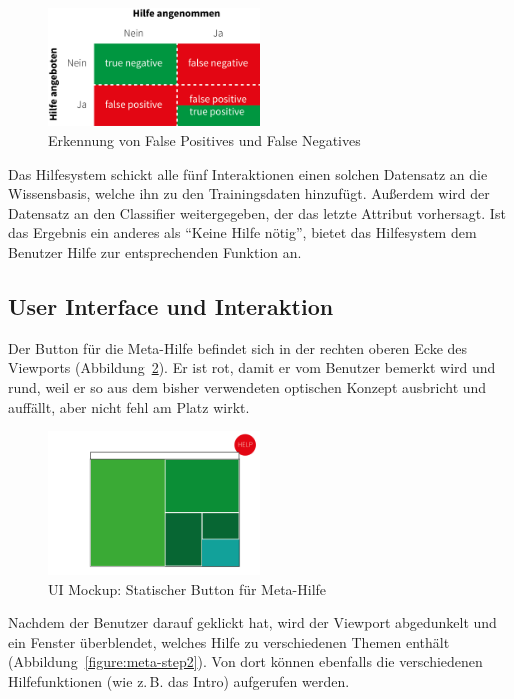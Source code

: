 \documentclass[
	headsepline,
	footsepline,
	fontsize=12pt,
	bibliography=totoc
]{scrbook}
\begin{document}
\begin{figure}[htbp]
   \centering
   \includegraphics[width=0.5\textwidth]{images/konzeption-meta-dyn-id.png}
   \caption{Erkennung von False Positives und False Negatives}
   \label{figure:meta-dyn-id}
\end{figure}

Das Hilfesystem schickt alle fünf Interaktionen einen solchen Datensatz an die Wissensbasis, welche ihn zu den Trainingsdaten hinzufügt. Außerdem wird der Datensatz an den Classifier weitergegeben, der das letzte Attribut vorhersagt. Ist das Ergebnis ein anderes als \enquote{Keine Hilfe nötig}, bietet das Hilfesystem dem Benutzer Hilfe zur entsprechenden Funktion an.

\subsection{User Interface und Interaktion}

Der Button für die Meta-Hilfe befindet sich in der rechten oberen Ecke des Viewports (Abbildung~\ref{figure:meta-step1}). Er ist rot, damit er vom Benutzer bemerkt wird und rund, weil er so aus dem bisher verwendeten optischen Konzept ausbricht und auffällt, aber nicht fehl am Platz wirkt.

\begin{figure}[htbp]
   \centering
   \includegraphics[width=0.5\textwidth]{images/konzeption-meta-step1.png}
   \caption{UI Mockup: Statischer Button für Meta-Hilfe}
   \label{figure:meta-step1}
\end{figure}

Nachdem der Benutzer darauf geklickt hat, wird der Viewport abgedunkelt und ein Fenster überblendet, welches Hilfe zu verschiedenen Themen enthält (Abbildung~\ref{figure:meta-step2}). Von dort können ebenfalls die verschiedenen Hilfefunktionen (wie z.\,B. das Intro) aufgerufen werden.
\end{document}
